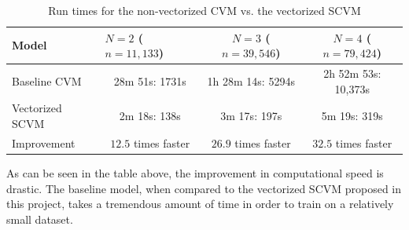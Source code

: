 \begin{table}[H]
\centering
\begin{tabular}{|l|ccc|}
\hline
Model           & \multicolumn{1}{l}{$N = 2$ ($n = 11,133$)} & $N = 3$ ($n = 39,546$)& $N = 4$ ($n = 79,424$)         \\ \hline
Baseline CVM    & 28m 51s: 1731s            & 1h 28m 14s: 5294s             & 2h 52m 53s: 10,373s    \\
Vectorized SCVM & 2m 18s: 138s              & 3m 17s: 197s  & 5m 19s: 319s    \\ \hline
Improvement & $12.5$ times faster  & $26.9$ times faster  & $32.5$ times faster   \\ \hline
\end{tabular}
\caption{Run times for the non-vectorized CVM vs. the vectorized SCVM}
\label{tab:RuntimeBaseline}
\end{table}
\noindent 
As can be seen in the table above, the improvement in computational speed is drastic.
The baseline model, when compared to the vectorized SCVM proposed in this project, takes a tremendous amount of time in order to train on a relatively small dataset.


